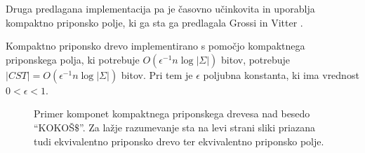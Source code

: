 Druga predlagana implementacija pa je časovno učinkovita in uporablja kompaktno priponsko polje, ki ga sta ga predlagala Grossi in Vitter \cite{Grossi2000}. 
\begin{posl}\label{pos:CSAlog}
Kompaktno priponsko drevo implementirano s pomočjo kompaktnega priponskega polja, ki potrebuje $O(\epsilon^{-1}n\log{| \Sigma|})$ bitov, potrebuje $|CST|=O(\epsilon^{-1}n\log{| \Sigma|})$ bitov. Pri tem je $\epsilon$ poljubna konstanta, ki ima vrednost $0<\epsilon<1$.
\end{posl}

\begin{figure}[htb]
    \begin{subfigure}[t]{0.4\linewidth}
        
        \begin{subfigure}[t]{1\linewidth}        
            
            \centering
            \subcaption*{}
            \label{fig:neKompaktnoDrevo}
        \end{subfigure}
        \begin{subfigure}[t]{1\linewidth}        
            
            \centering
            \subcaption*{}
            \label{fig:KompaktnoPolje}
        \end{subfigure}
        \centering
        \subcaption*{}
        \label{fig:neKompaktno}
    \end{subfigure}
    \begin{subfigure}[t]{0.6\linewidth}        
        \begin{subfigure}[t]{1\linewidth}  
            \hspace{0.25cm}      
            
            \subcaption*{}
            \label{fig:neKompaktnoDrevo}
        \end{subfigure}
        \begin{subfigure}[t]{1\linewidth}        
            
            \centering
            \subcaption*{}
            \label{fig:KompaktnoPolje}
        \end{subfigure}
        \subcaption*{}
        \label{fig:Kompaktno}
    \end{subfigure}
    \caption{Primer komponet kompaktnega priponskega drevesa nad besedo \enquote{KOKOŠ$\$$}. Za lažje razumevanje sta na levi strani sliki priazana tudi ekvivalentno priponsko drevo ter ekvivalentno priponsko polje.} 
    \label{fig:CST}
\end{figure}

